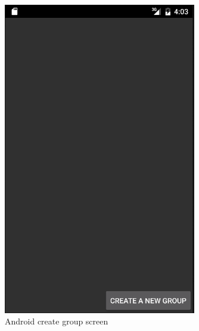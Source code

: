 	\begin{figure}[tbh]
	\begin{center}
	\includegraphics[width=0.75\textwidth]{AndroidPictures/createNewGroup.png}
	\end{center}
	\caption{Android create group screen \label{AndroidCreateGroup}}
	\end{figure}

